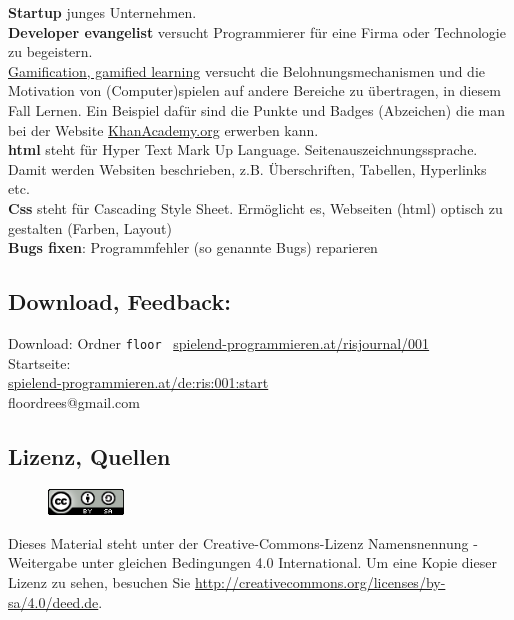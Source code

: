 \textbf{Startup} junges Unternehmen. \\

\textbf{Developer evangelist} versucht Programmierer für eine Firma oder Technologie zu begeistern. \\

\href{https://de.wikipedia.org/wiki/Gamification}{Gamification, gamified learning} versucht die Belohnungsmechanismen und die Motivation von (Computer)spielen auf andere Bereiche zu übertragen, in diesem Fall Lernen. Ein Beispiel dafür sind die Punkte und Badges (Abzeichen) die man bei der Website \href{http://khanacademy.org}{KhanAcademy.org} erwerben kann. \\
 
\textbf{html} steht für Hyper Text Mark Up Language. Seitenauszeichnungssprache. Damit werden Websiten beschrieben, z.B. Überschriften, Tabellen, Hyperlinks etc. \\

\textbf{Css} steht für Cascading Style Sheet. Ermöglicht es, Webseiten (html) optisch zu gestalten (Farben, Layout) \\

\textbf{Bugs fixen}: Programmfehler (so genannte Bugs) reparieren \\


\subsection*{Download, Feedback:}
\footnotesize{
Download: Ordner \texttt{floor} \Mundus\ \href{http://spielend-programmieren.at/risjournal/001}{spielend-programmieren.at/risjournal/001}\\
Startseite:\\
\href{http://spielend-programmieren.at/de:ris:001:start}{spielend-programmieren.at/de:ris:001:start}\\ 
\Letter\:  floordrees@gmail.com \\}
\normalsize
 

\subsection*{Lizenz, Quellen}

\begin{figure}
\includegraphics[width=2cm]{floor/ccbysa88x31.png}
\end{figure}
Dieses Material steht unter der Creative-Commons-Lizenz Namensnennung - Weitergabe unter gleichen Bedingungen 4.0 International. Um eine Kopie dieser Lizenz zu sehen, besuchen Sie \url{http://creativecommons.org/licenses/by-sa/4.0/deed.de}.

